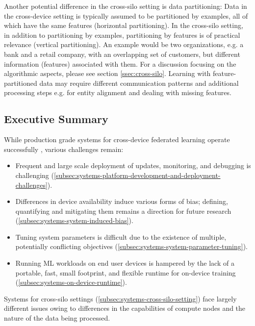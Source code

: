 \documentclass[11pt]{article}
\begin{document}
Another potential difference in the cross-silo setting is data partitioning: Data in the cross-device setting is typically assumed to be partitioned by examples, all of which have the same features (horizontal partitioning). In the cross-silo setting, in addition to partitioning by examples, partitioning by features is of practical relevance (vertical partitioning). An example would be two organizations, e.g. a bank and a retail company,  with an overlapping set of customers, but different information (features) associated with them. For a discussion focusing on the algorithmic aspects, please see section \ref{ssec:cross-silo}. Learning with feature-partitioned data may require different communication patterns and additional processing steps e.g. for entity alignment and dealing with missing features.

\subsection{Executive Summary}
While production grade systems for cross-device federated learning operate successfully \cite{bonawitz19sysml,apple19wwdc}, various challenges remain:
\begin{itemize}
    \item Frequent and large scale deployment of updates, monitoring, and debugging is challenging (\cref{subsec:systems-platform-development-and-deployment-challenges}).
    \item Differences in device availability induce various forms of bias; defining, quantifying and mitigating them remains a direction for future research (\cref{subsec:systems-system-induced-bias}).
    \item Tuning system parameters is difficult due to the existence of multiple, potentially conflicting objectives (\cref{subsec:systems-system-parameter-tuning}).
    \item Running ML workloads on end user devices is hampered by the lack of a portable, fast, small footprint, and flexible runtime for on-device training (\cref{subsec:systems-on-device-runtime}).
\end{itemize}

Systems for cross-silo settings (\cref{subsec:systems-cross-silo-setting}) face largely different issues owing to differences in the capabilities of compute nodes and the nature of the data being processed.


\pagebreak
\end{document}
